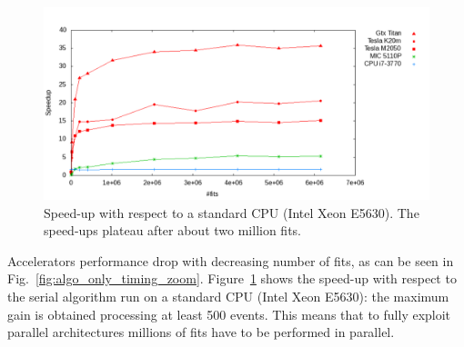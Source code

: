 \documentclass[journal]{IEEEtran}
\begin{document}
\begin{figure}[!t]
  \centering
  \includegraphics[width=0.9\linewidth]{figures/Speedup_MIC}
  \caption{Speed-up with respect to a standard CPU (Intel Xeon
    E5630). The speed-ups plateau after about two million fits.}
  \label{fig:algo_only_speedup}
\end{figure}
Accelerators performance drop with decreasing number of fits, as can be seen 
in Fig.~\ref{fig:algo_only_timing_zoom}.
Figure~\ref{fig:algo_only_speedup} shows the speed-up with respect to the serial 
algorithm run on a standard CPU (Intel Xeon E5630): the maximum gain is 
obtained processing at least 500 events. This means that to fully exploit 
parallel architectures millions of fits have to be performed in parallel.  

%
\end{document}
